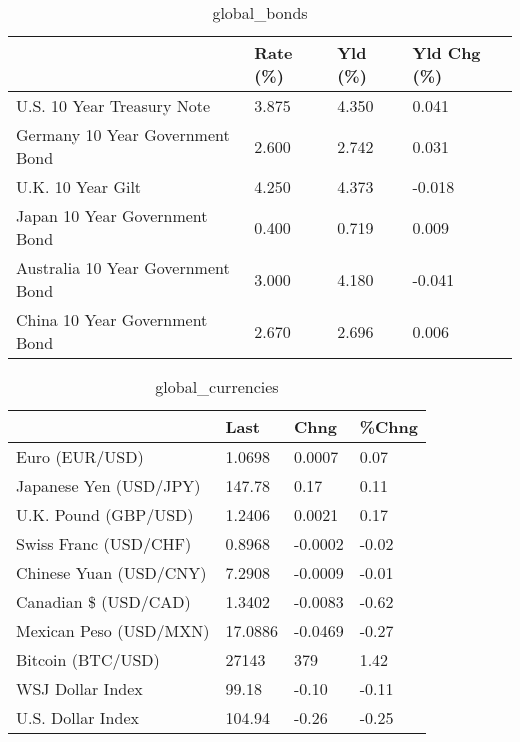 \documentclass{article}%
\begin{document}
%


\begin{table}[htbp]%
\caption{global\_bonds}%
\centering%
\begin{adjustbox}{width=1\textwidth}%
\begin{tabular}{llll}
\toprule
                                  & Rate (\%) & Yld (\%) & Yld Chg (\%) \\
\midrule
       U.S. 10 Year Treasury Note &    3.875 &   4.350 &       0.041 \\
  Germany 10 Year Government Bond &    2.600 &   2.742 &       0.031 \\
                U.K. 10 Year Gilt &    4.250 &   4.373 &      -0.018 \\
    Japan 10 Year Government Bond &    0.400 &   0.719 &       0.009 \\
Australia 10 Year Government Bond &    3.000 &   4.180 &      -0.041 \\
    China 10 Year Government Bond &    2.670 &   2.696 &       0.006 \\
\bottomrule
\end{tabular}
%
\end{adjustbox}%
\end{table}

%


\begin{table}[htbp]%
\caption{global\_currencies}%
\centering%
\begin{adjustbox}{width=1\textwidth}%
\begin{tabular}{llll}
\toprule
                       &    Last &    Chng & \%Chng \\
\midrule
        Euro (EUR/USD) &  1.0698 &  0.0007 &  0.07 \\
Japanese Yen (USD/JPY) &  147.78 &    0.17 &  0.11 \\
  U.K. Pound (GBP/USD) &  1.2406 &  0.0021 &  0.17 \\
 Swiss Franc (USD/CHF) &  0.8968 & -0.0002 & -0.02 \\
Chinese Yuan (USD/CNY) &  7.2908 & -0.0009 & -0.01 \\
  Canadian \$ (USD/CAD) &  1.3402 & -0.0083 & -0.62 \\
Mexican Peso (USD/MXN) & 17.0886 & -0.0469 & -0.27 \\
     Bitcoin (BTC/USD) &   27143 &     379 &  1.42 \\
      WSJ Dollar Index &   99.18 &   -0.10 & -0.11 \\
     U.S. Dollar Index &  104.94 &   -0.26 & -0.25 \\
\bottomrule
\end{tabular}
%
\end{adjustbox}%
\end{table}
\end{document}
